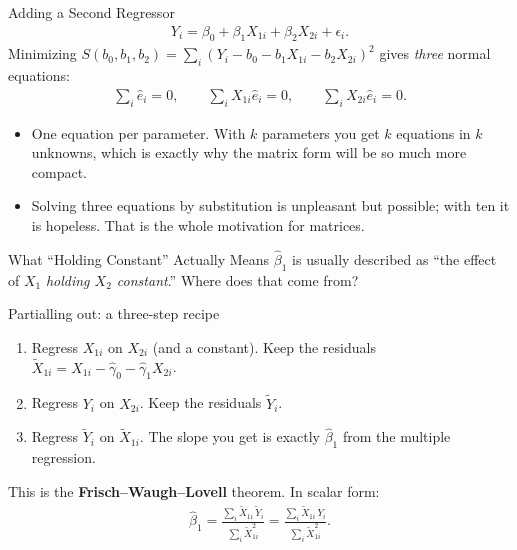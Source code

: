 \documentclass[aspectratio=169,11pt,xcolor=dvipsnames]{beamer}
\begin{document}
\begin{frame}{Adding a Second Regressor}
\begin{align*}
  Y_i = \beta_0 + \beta_1 X_{1i} + \beta_2 X_{2i} + \epsilon_i .
\end{align*}
Minimizing $S(b_0,b_1,b_2) = \sum_i (Y_i - b_0 - b_1X_{1i} - b_2X_{2i})^2$ gives
\emph{three} normal equations:
\begin{align*}
  \sum_i \hat e_i = 0, \qquad
  \sum_i X_{1i}\hat e_i = 0, \qquad
  \sum_i X_{2i}\hat e_i = 0 .
\end{align*}
\vskip4pt
\begin{itemize}
  \item One equation per parameter. With $k$ parameters you get $k$ equations in
        $k$ unknowns, which is exactly why the matrix form will be so much
        more compact.
  \item Solving three equations by substitution is unpleasant but possible; with
        ten it is hopeless. That is the whole motivation for matrices.
\end{itemize}
\end{frame}

\begin{frame}{What ``Holding Constant'' Actually Means}
$\hat\beta_1$ is usually described as ``the effect of $X_1$ \emph{holding $X_2$
constant}.'' Where does that come from?
\vskip4pt
\begin{block}{Partialling out: a three-step recipe}
\begin{enumerate}\itemsep2pt
  \item Regress $X_{1i}$ on $X_{2i}$ (and a constant). Keep the residuals
        $\tilde X_{1i} = X_{1i} - \hat\gamma_0 - \hat\gamma_1 X_{2i}$.
  \item Regress $Y_i$ on $X_{2i}$. Keep the residuals $\tilde Y_i$.
  \item Regress $\tilde Y_i$ on $\tilde X_{1i}$. \alert{The slope you get is
        exactly $\hat\beta_1$ from the multiple regression.}
\end{enumerate}
\end{block}
\vskip2pt
This is the \textbf{Frisch--Waugh--Lovell} theorem. In scalar form:
\begin{align*}
  \hat\beta_1 = \frac{\sum_i \tilde X_{1i}\, \tilde Y_i}{\sum_i \tilde X_{1i}^2}
              = \frac{\sum_i \tilde X_{1i}\, Y_i}{\sum_i \tilde X_{1i}^2} .
\end{align*}
\end{frame}
\end{document}
